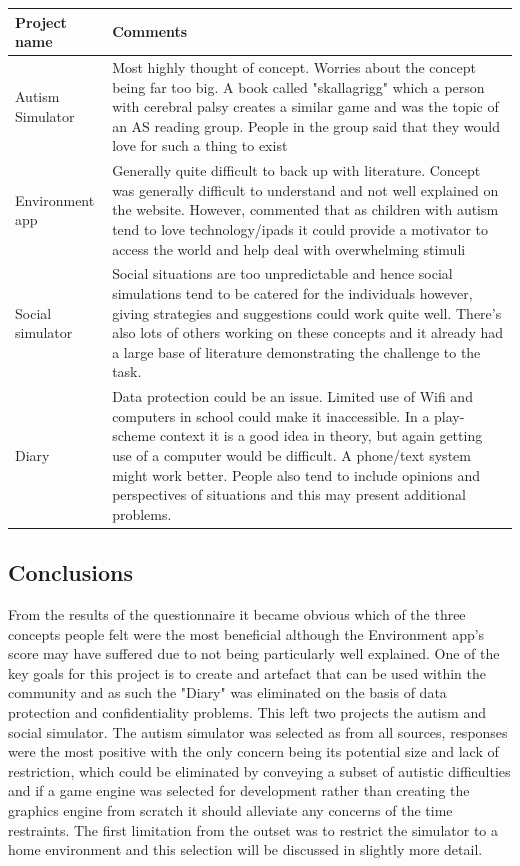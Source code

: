 \documentclass[11pt]{report}
\begin{document}
\begin{table}[H]
    \begin{tabular}{| p{3cm} | p{12cm} |}
    \hline
    Project name & Comments \\ \hline
    Autism Simulator & Most highly thought of concept. Worries about the concept being far too big. A book called "skallagrigg" which a person with cerebral palsy creates a similar game and was the topic of an AS reading group. People in the group said that they would love for such a thing to exist\\ \hline
    Environment app & Generally quite difficult to back up with literature. Concept was generally difficult to understand and not well explained on the website. However, commented that as children with autism tend to love technology/ipads it could provide a motivator to access the world and help deal with overwhelming stimuli\\ \hline
    Social simulator & Social situations are too unpredictable and hence social simulations tend to be catered for the individuals however, giving strategies and suggestions could work quite well. There's also lots of others working on these concepts and it already had a large base of literature demonstrating the challenge to the task. \\ \hline
    Diary & Data protection could be an issue. Limited use of Wifi and computers in school could make it inaccessible. In a play-scheme context it is a good idea in theory, but again getting use of a computer would be difficult. A phone/text system might work better. People also tend to include opinions and perspectives of situations and this may present additional problems. \\ \hline
    \end{tabular}
\end{table}

\subsection{Conclusions}
From the results of the questionnaire it became obvious which of the three concepts people felt were the most beneficial although the Environment app's score may have suffered due to not being particularly well explained. One of the key goals for this project is to create and artefact that can be used within the community and as such the "Diary" was eliminated on the basis of data protection and confidentiality problems. This left two projects the autism and social simulator. 
The autism simulator was selected as from all sources, responses were the most positive with the only concern being its potential size and lack of restriction, which could be eliminated by conveying a subset of autistic difficulties and if a game engine was selected for development rather than creating the graphics engine from scratch it should alleviate any concerns of the time restraints. The first limitation from the outset was to restrict the simulator to a home environment and this selection will be discussed in slightly more detail. 
\end{document}
